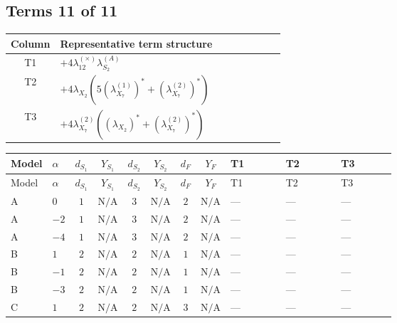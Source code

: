 \documentclass[8pt]{article}
\begin{document}
\begin{landscape}
\subsection*{Terms 11 of 11}
\begin{center}
\begin{tabular}{@{}c >{\raggedright\arraybackslash}p{0.82\linewidth}@{}}
\toprule
Column & Representative term structure \\
\midrule
T1 & \(\displaystyle +4 {\lambda_{12}^{(\times)}} {\lambda_{S_2}^{(A)}}\) \\
\midrule
T2 & \(\displaystyle +4 {\lambda_{X_{2}}} (5 \left({\lambda_{X_{7}}^{(1)}}\right)^{*}+\left({\lambda_{X_{7}}^{(2)}}\right)^{*})\) \\
\midrule
T3 & \(\displaystyle +4 {\lambda_{X_{7}}^{(2)}} (\left({\lambda_{X_{2}}}\right)^{*}+\left({\lambda_{X_{7}}^{(2)}}\right)^{*})\) \\
\midrule
\bottomrule
\end{tabular}
\end{center}
\smallskip
\tiny
\begin{longtable}{@{}llcccccc >{\raggedright\arraybackslash}p{0.21\linewidth} >{\raggedright\arraybackslash}p{0.21\linewidth} >{\raggedright\arraybackslash}p{0.21\linewidth}@{}}
\toprule
Model & $\alpha$ & $d_{S_1}$ & $Y_{S_1}$ & $d_{S_2}$ & $Y_{S_2}$ & $d_F$ & $Y_F$ & T1 & T2 & T3 \\
\midrule
\endfirsthead
\toprule
Model & $\alpha$ & $d_{S_1}$ & $Y_{S_1}$ & $d_{S_2}$ & $Y_{S_2}$ & $d_F$ & $Y_F$ & T1 & T2 & T3 \\
\midrule
\endhead
A & $0$ & $1$ & $\text{N/A}$ & $3$ & $\text{N/A}$ & $2$ & $\text{N/A}$ & --- & --- & --- \\
\midrule
A & $-2$ & $1$ & $\text{N/A}$ & $3$ & $\text{N/A}$ & $2$ & $\text{N/A}$ & --- & --- & --- \\
\midrule
A & $-4$ & $1$ & $\text{N/A}$ & $3$ & $\text{N/A}$ & $2$ & $\text{N/A}$ & --- & --- & --- \\
\midrule
B & $1$ & $2$ & $\text{N/A}$ & $2$ & $\text{N/A}$ & $1$ & $\text{N/A}$ & --- & --- & --- \\
\midrule
B & $-1$ & $2$ & $\text{N/A}$ & $2$ & $\text{N/A}$ & $1$ & $\text{N/A}$ & --- & --- & --- \\
\midrule
B & $-3$ & $2$ & $\text{N/A}$ & $2$ & $\text{N/A}$ & $1$ & $\text{N/A}$ & --- & --- & --- \\
\midrule
C & $1$ & $2$ & $\text{N/A}$ & $2$ & $\text{N/A}$ & $3$ & $\text{N/A}$ & --- & --- & --- \\

\end{longtable}
\end{landscape}
\end{document}
